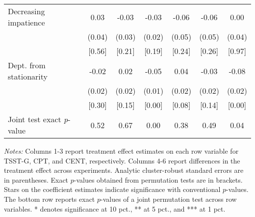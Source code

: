 \begin{table}[htbp]
{\begin{threeparttable}
\begin{tabular}{l*{6}{c}}
Decreasing impatience&     0.03&    -0.03&    -0.03&    -0.06&    -0.06&     0.00\\
          &   (0.04)&   (0.03)&   (0.02)&   (0.05)&   (0.05)&   (0.04)\\
          &   [0.56]&   [0.21]&   [0.19]&   [0.24]&   [0.26]&   [0.97]\\
Dept. from stationarity&    -0.02&     0.02&-0.05\sym{***}&0.04\sym{*}&    -0.03&-0.08\sym{***}\\
          &   (0.02)&   (0.02)&   (0.01)&   (0.02)&   (0.02)&   (0.02)\\
          &   [0.30]&   [0.15]&[0.00\sym{***}]&[0.08\sym{*}]&   [0.14]&[0.00\sym{***}]\\
\midrule Joint test exact \emph{p}-value&     0.52&     0.67&0.00\sym{***}&     0.38&     0.49&0.04\sym{**}\\
\bottomrule \end{tabular} \begin{tablenotes}[flushleft] \footnotesize \item \emph{Notes:} Columns 1-3 report treatment effect estimates on each row variable for TSST-G, CPT, and CENT, respectively. Columns 4-6 report differences in the treatment effect across experiments. Analytic cluster-robust standard errors are in parentheses. Exact \(p\)-values obtained from permutation tests are in brackets. Stars on the coefficient estimates indicate significance with conventional \(p\)-values. The bottom row reports exact \(p\)-values of a joint permutation test across row variables. * denotes significance at 10 pct., ** at 5 pct., and *** at 1 pct. \end{tablenotes} \end{threeparttable} } \end{table}
